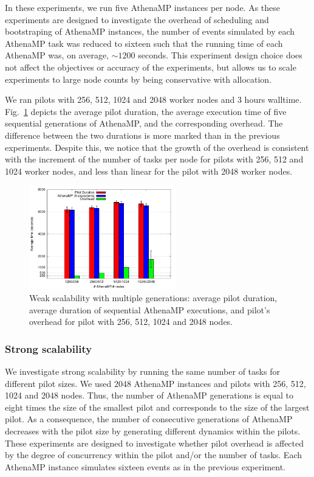 In these experiments, we run five AthenaMP instances per node. As these
experiments are designed to investigate the overhead of 
scheduling and bootstraping of AthenaMP instances, the number of
events simulated by each AthenaMP task was reduced to sixteen such that the
running time of each AthenaMP was, on average, $\sim 1200$ seconds. This
experiment design choice does not affect the objectives or accuracy of the
experiments, but allows us to scale experiments to large node counts by being
conservative with allocation.

We ran pilots with 256, 512, 1024 and 2048 worker nodes and 3
hours walltime. Fig.~\ref{fig:weakScal2a} depicts the average pilot duration,
the average execution time of five sequential generations of AthenaMP, and
the corresponding overhead. The difference between the two durations is more
marked than in the previous experiments. Despite this, we notice that the
growth of the overhead is consistent with the increment of the number of
tasks per node for pilots with 256, 512 and 1024 worker nodes, and less than
linear for the pilot with 2048 worker nodes.

\begin{figure}[!t]
        \includegraphics[height=4.5cm,width=\columnwidth]{./figures/NGE/weak2.pdf}
        \vspace{-0.3in}
    \caption{Weak scalability with multiple generations: average pilot
    duration, average duration of sequential AthenaMP executions, and
    pilot's overhead for pilot with 256, 512, 1024 and 2048 nodes.}
\label{fig:weakScal2a}
\end{figure}


\subsubsection{Strong scalability}

We investigate strong scalability by running the same number of tasks for
different pilot sizes. We used 2048 AthenaMP instances and pilots with 256,
512, 1024 and 2048 nodes. Thus, the number of AthenaMP generations is equal
to eight times the size of the smallest pilot and corresponds to the size of
the largest pilot. As a consequence, the number of consecutive generations of
AthenaMP decreases with the pilot size by generating different dynamics
within the pilots. These experiments are designed to investigate whether
pilot overhead is affected by the degree of concurrency within the pilot
and/or the number of tasks. Each AthenaMP instance simulates sixteen events
as in the previous experiment.

